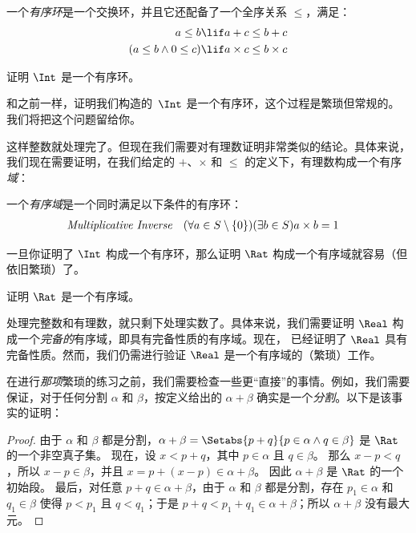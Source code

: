 \documentclass[../../../include/open-logic-section]{subfiles}
\begin{document}
\begin{defn}
一个\emph{有序环}是一个交换环，并且它还配备了一个全序关系 $\leq$，满足：
\begin{align*}
	a \leq b &\lif a + c \leq b + c\\
	(a \leq b \land 0 \leq c) &\lif a \times c \leq b \times c
\end{align*}
\end{defn}

\begin{prob}
证明 $\Int$ 是一个有序环。
\end{prob}

和之前一样，证明我们构造的~$\Int$ 是一个有序环，这个过程是繁琐但常规的。我们将把这个问题留给你。

这样整数就处理完了。但现在我们需要对有理数证明非常类似的结论。具体来说，我们现在需要证明，在我们给定的 $+$、$\times$ 和 $\leq$ 的定义下，有理数构成一个有序\emph{域}：

\begin{defn}
一个\emph{有序域}是一个同时满足以下条件的有序环：
\begin{align*}
	\emph{Multiplicative Inverse}& & (\forall a \in S \setminus \{0\})(\exists b \in S) a\times b& = 1
\end{align*}
\end{defn}

一旦你证明了 $\Int$ 构成一个有序环，那么证明 $\Rat$ 构成一个有序域就容易（但依旧繁琐）了。

\begin{prob}
证明 $\Rat$ 是一个有序域。
\end{prob}

处理完整数和有理数，就只剩下处理实数了。具体来说，我们需要证明 $\Real$ 构成一个\emph{完备的}有序域，即具有完备性质的有序域。现在， 已经证明了 $\Real$ 具有完备性质。然而，我们仍需进行验证 $\Real$ 是一个有序域的（繁琐）工作。

在进行\emph{那项}繁琐的练习之前，我们需要检查一些更“直接”的事情。例如，我们需要保证，对于任何分割 $\alpha$ 和 $\beta$，按定义给出的 $\alpha + \beta$ 确实是一个\emph{分割}。以下是该事实的证明：

\begin{proof}
由于 $\alpha$ 和 $\beta$ 都是分割，$\alpha + \beta = \Setabs{p
+ q}{p \in \alpha \land q \in \beta}$ 是 $\Rat$ 的一个非空真子集。
现在，设 $x < p + q$，其中 $p \in \alpha$ 且 $q \in \beta$。
那么 $x - p < q$，所以 $x - p \in \beta$，并且 $x = p + (x - p) \in
\alpha + \beta$。
因此 $\alpha + \beta$ 是 $\Rat$ 的一个初始段。
最后，对任意 $p + q \in \alpha + \beta$，由于 $\alpha$ 和
$\beta$ 都是分割，存在 $p_1 \in \alpha$ 和 $q_1 \in \beta$
使得 $p < p_1$ 且 $q < q_1$；于是 $p + q < p_1 + q_1 \in \alpha +
\beta$；所以 $\alpha + \beta$ 没有最大元。
\end{proof}
\end{document}
